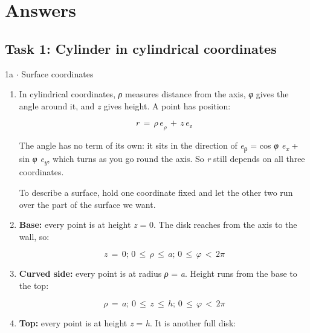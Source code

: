 \documentclass[11pt]{article}
\begin{document}
\section{Answers}
\begin{keepsection}\subsection{Task 1: Cylinder in cylindrical coordinates}

\begin{workedbox}{1a \ensuremath{\cdot} Surface coordinates}
\begin{enumerate}
\item {}
In cylindrical coordinates, \textit{ρ} measures distance from the axis, \textit{φ} gives the angle around it, and \textit{z} gives height. A point has position:

\begin{equation*}{r}\, =\, {ρ\,e}_{ρ}\, +\, {z\,e}_{\mathrm{z}}\end{equation*}

The angle has no term of its own: it sits in the direction of \textit{e}\textsubscript{ρ} = cos \textit{φ e}\textsubscript{\textit{x}} + sin \textit{φ e}\textsubscript{\textit{y}}, which turns as you go round the axis. So \textit{r} still depends on all three coordinates.

To describe a surface, hold one coordinate fixed and let the other two run over the part of the surface we want.
\item {}
\textbf{Base:} every point is at height \textit{z} = 0. The disk reaches from the axis to the wall, so:

\begin{equation*}{z}\, =\, 0;\, 0\, \leq \, {ρ}\, \leq \, {a};\, 0\, \leq \, {φ}\, <\, 2π\end{equation*}
\item {}
\textbf{Curved side:} every point is at radius \textit{ρ} = \textit{a}. Height runs from the base to the top:

\begin{equation*}{ρ}\, =\, {a};\, 0\, \leq \, {z}\, \leq \, {h};\, 0\, \leq \, {φ}\, <\, 2π\end{equation*}
\item {}
\textbf{Top:} every point is at height \textit{z} = \textit{h}. It is another full disk:


\end{enumerate}
\end{workedbox}
\end{keepsection}
\end{document}
